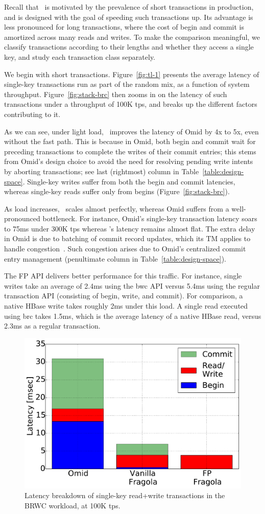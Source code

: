 Recall that \sys\ is motivated by the prevalence of short transactions in production, and is designed with
the goal of speeding such transactions up.
Its advantage is less pronounced for long transactions, where the cost of begin and commit is amortized
across many reads and writes.
To make the comparison meaningful, we classify transactions according to their lengths and whether they
access a single key, and study each transaction class separately. 

We begin with short transactions. 
Figure~\ref{fig:tl-1} presents the average latency of single-key transactions run as part of the random mix,
as a function of {system} throughput.
Figure~\ref{fig:stack-brc}  then zooms in on the latency of such transactions under 
a throughput of 100K tps, and breaks up the different factors contributing to it. 

As we can see, under light load, \sys\ improves the latency of Omid by 4x to 5x, even without the fast path.
This is because in Omid, both begin and commit wait for preceding transactions to complete the writes of 
their commit entries; this stems from Omid's design choice to avoid the need for resolving pending write intents
by aborting transactions; see last (rightmost) column in Table~\ref{table:design-space}. 
Single-key writes suffer from both the begin and commit latencies, whereas single-key reads  
suffer only from begins (Figure~\ref{fig:stack-brc}). 

As load increases, \sys\ scales almost perfectly, whereas Omid suffers from a well-pronounced 
bottleneck. For instance, Omid's single-key transaction latency soars to 75ms under 300K tps whereas
{\sys}'s latency remains almost flat. The extra delay in Omid is due to batching of commit record updates, 
which its TM applies to handle congestion~\cite{Omid2017}. Such congestion arises due to Omid's centralized 
commit entry management (penultimate column in Table~\ref{table:design-space}).

The FP API delivers better performance for this traffic. For instance, single writes take an average of 2.4ms using 
the {\code bwc} API versus 5.4ms using the regular transaction API (consisting of begin, write, and commit). 
For comparison, a native HBase write takes roughly 2ms under this load.
A single read executed using {\code brc} takes 1.5ms, which is the average latency of a native HBase read,
versus 2.3ms as a regular transaction. 

\begin{figure}[htb]
\centering
\includegraphics[width=.4\textwidth]{figs/latency_rwm.pdf}
\caption{Latency breakdown of single-key read+write transactions in the BRWC workload,
at 100K tps.}
\label{fig:rmw}
\end{figure}

